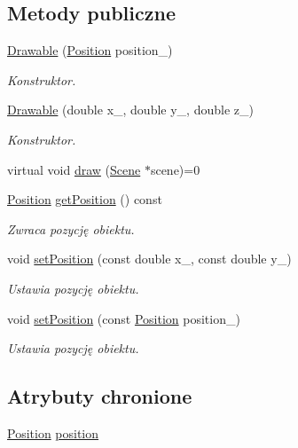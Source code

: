 \subsection*{Metody publiczne}
\begin{DoxyCompactItemize}
\item 
\hyperlink{class_drawable_acdf5ee89ba1c083f4162cfd892c1989c}{Drawable} (\hyperlink{struct_position}{Position} position\-\_\-)
\begin{DoxyCompactList}\small\item\em Konstruktor. \end{DoxyCompactList}\item 
\hyperlink{class_drawable_a7799a0919cf41e051ef48f2467a8686f}{Drawable} (double x\-\_\-, double y\-\_\-, double z\-\_)
\begin{DoxyCompactList}\small\item\em Konstruktor. \end{DoxyCompactList}\item 
virtual void \hyperlink{class_drawable_a1e24b799e5b5f5494b25a42e2624692c}{draw} (\hyperlink{class_scene}{Scene} $\ast$scene)=0
\item 
\hyperlink{struct_position}{Position} \hyperlink{class_drawable_ae9383e020b150097521c248763c071fa}{get\-Position} () const 
\begin{DoxyCompactList}\small\item\em Zwraca pozycję obiektu. \end{DoxyCompactList}\item 
void \hyperlink{class_drawable_ab4a98a7b3e4fd76a2d14b9f1d51c3a41}{set\-Position} (const double x\-\_\-, const double y\-\_\-)
\begin{DoxyCompactList}\small\item\em Ustawia pozycję obiektu. \end{DoxyCompactList}\item 
void \hyperlink{class_drawable_afa4dae6843185ee5a2cdaf79325099a5}{set\-Position} (const \hyperlink{struct_position}{Position} position\-\_\-)
\begin{DoxyCompactList}\small\item\em Ustawia pozycję obiektu. \end{DoxyCompactList}\end{DoxyCompactItemize}
\subsection*{Atrybuty chronione}
\begin{DoxyCompactItemize}
\item 
\hyperlink{struct_position}{Position} \hyperlink{class_drawable_aaeba34b10714af371e05d44d825af8a5}{position}
\end{DoxyCompactItemize}


